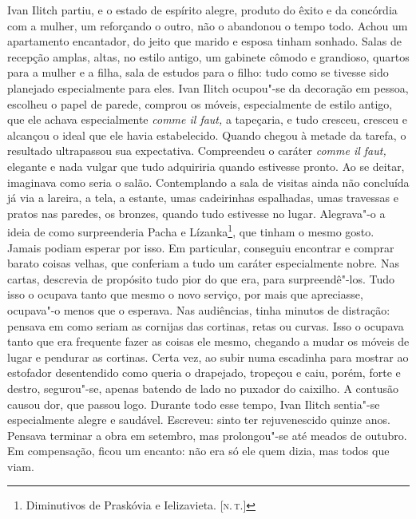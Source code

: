 Ivan Ilitch partiu, e o estado de espírito alegre, produto do êxito e da
concórdia com a mulher, um reforçando o outro, não o abandonou o tempo
todo. Achou um apartamento encantador, do jeito que marido e esposa
tinham sonhado. Salas de recepção amplas, altas, no estilo antigo, um
gabinete cômodo e grandioso, quartos para a mulher e a filha, sala de
estudos para o filho: tudo como se tivesse sido planejado especialmente
para eles. Ivan Ilitch ocupou"-se da decoração em pessoa, escolheu o
papel de parede, comprou os móveis, especialmente de estilo antigo, que
ele achava especialmente \emph{comme il faut,} a tapeçaria, e tudo
cresceu, cresceu e alcançou o ideal que ele havia estabelecido. Quando
chegou à metade da tarefa, o resultado ultrapassou sua expectativa.
Compreendeu o caráter \emph{comme il faut,} elegante e nada vulgar que
tudo adquiriria quando estivesse pronto. Ao se deitar, imaginava como
seria o salão. Contemplando a sala de visitas ainda não concluída já via
a lareira, a tela, a estante, umas cadeirinhas espalhadas, umas
travessas e pratos nas paredes, os bronzes, quando tudo estivesse no
lugar. Alegrava"-o a ideia de como surpreenderia Pacha e
Lízanka\footnote{Diminutivos de Praskóvia e Ielizavieta. {[}\textsc{n.\,t.}{]}},
que tinham o mesmo gosto. Jamais podiam esperar por isso. Em particular,
conseguiu encontrar e comprar barato coisas velhas, que conferiam a tudo
um caráter especialmente nobre. Nas cartas, descrevia de propósito tudo
pior do que era, para surpreendê"-los. Tudo isso o ocupava tanto que
mesmo o novo serviço, por mais que apreciasse, ocupava"-o menos que o
esperava. Nas audiências, tinha minutos de distração: pensava em como
seriam as cornijas das cortinas, retas ou curvas. Isso o ocupava tanto
que era frequente fazer as coisas ele mesmo, chegando a mudar os móveis
de lugar e pendurar as cortinas. Certa vez, ao subir numa escadinha para
mostrar ao estofador desentendido como queria o drapejado, tropeçou e
caiu, porém, forte e destro, segurou"-se, apenas batendo de lado no
puxador do caixilho. A contusão causou dor, que passou logo. Durante
todo esse tempo, Ivan Ilitch sentia"-se especialmente alegre e saudável.
Escreveu: sinto ter rejuvenescido quinze anos. Pensava terminar a obra
em setembro, mas prolongou"-se até meados de outubro. Em compensação,
ficou um encanto: não era só ele quem dizia, mas todos que viam.

